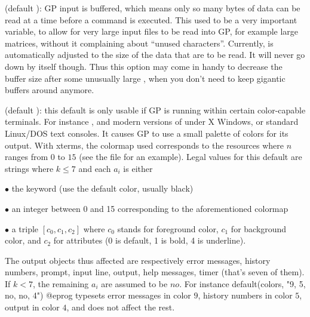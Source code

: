  (default ): GP input is buffered, which means
only so many bytes of data can be read at a time before a command is
executed. This used to be a very important variable, to allow for very
large input files to be read into GP, for example large matrices, without it
complaining about ``unused characters''. Currently,  is
automatically adjusted to the size of the data that are to be read. It will
never go down by itself though. Thus this option may come in handy to decrease
the buffer size after some unusually large , when you don't need to
keep gigantic buffers around anymore.

 (default ): this default is only usable if GP
\label{se:colors}
is running within certain color-capable terminals. For instance ,
 and modern versions of  under X Windows, or
standard Linux/DOS text consoles. It causes GP to use a small palette of
colors for its output. With xterms, the colormap used corresponds to the
resources  where $n$ ranges from $0$ to $15$ (see the
file  for an example). Legal values for this default are
strings  where $k\le7$ and each $a_i$ is either

\noindent $\bullet$ the keyword  (use the default color, usually
black)

\noindent $\bullet$ an integer between 0 and 15 corresponding to the
aforementioned colormap

\noindent $\bullet$ a triple $[c_0,c_1,c_2]$ where $c_0$ stands for foreground
color, $c_1$ for background color, and $c_2$ for attributes (0 is default, 1 
is bold, 4 is underline).

The output objects thus affected are respectively error messages,
history numbers, prompt, input line, output, help messages, timer (that's
seven of them). If $k < 7$, the remaining $a_i$ are assumed to be $no$. For
instance
%
\bprog
default(colors, "9, 5, no, no, 4")
@eprog
\noindent
typesets error messages in color $9$, history numbers in color $5$, output in
color $4$, and does not affect the rest.


